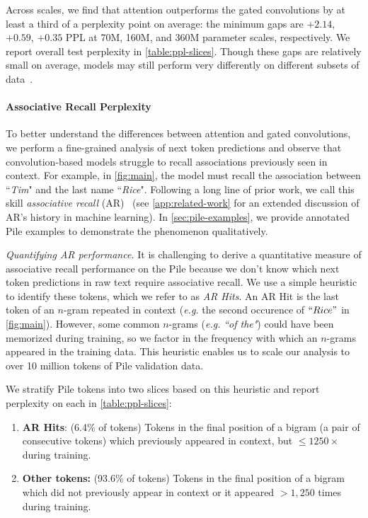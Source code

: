 Across scales, we find that attention outperforms the gated convolutions by at least a third of a perplexity point on average: the minimum gaps are $+2.14$, $+0.59$, $+0.35$ PPL at 70M, 160M, and 360M parameter scales, respectively. We report overall test perplexity in \ref{table:ppl-slices}. Though these gaps are relatively small on average, models may still perform very differently on different subsets of data~\citep{Eyuboglu2022-qz}.

\paragraph{Associative Recall Perplexity} To better understand the differences between attention and gated convolutions, we perform a fine-grained analysis of next token predictions and observe that convolution-based models struggle to recall associations previously seen in context. For example, in \ref{fig:main}, the model must recall the association between ``\textit{Tim}" and the last name ``\textit{Rice}".
Following a long line of prior work, we call this skill \textit{associative recall} (AR)~\citep{willshaw1969non,hopfield1982neural} (see \ref{app:related-work} for an extended discussion of AR's history in machine learning). In \ref{sec:pile-examples}, we provide annotated Pile examples to demonstrate the phenomenon qualitatively.

\textit{Quantifying AR performance.} It is challenging to derive a quantitative measure of associative recall performance on the Pile because we don't know which next token predictions in raw text require associative recall. We use a simple heuristic to identify these tokens, which we refer to as \textit{AR Hits}. An AR Hit is the last token of an $n$-gram repeated in context (\textit{e.g.} the second occurence of $``Rice"$ in \ref{fig:main}). However, some common $n$-grams (\textit{e.g.} \textit{``of the"}) could have been memorized during training, so we factor in the frequency with which an $n$-grams appeared in the training data. This heuristic enables us to scale our analysis to over 10 million tokens of Pile validation data.  

We stratify Pile tokens into two slices based on this heuristic and report perplexity on each in \ref{table:ppl-slices}:

\begin{enumerate}
    \item \textbf{AR Hits}: (6.4\% of tokens) Tokens in the final position of a bigram (a pair of consecutive tokens) which previously appeared in context, but $\leq 1250 \times$ during training. 
    \item \textbf{Other tokens:} (93.6\% of tokens)  Tokens in the final position of a bigram which did not previously appear in context or it appeared  $> 1,250$ times during training. 
\end{enumerate}

